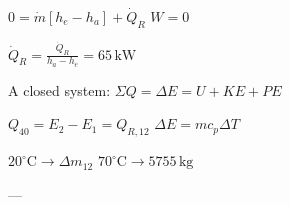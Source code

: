 \( 0 = \dot{m} \left[ h_e - h_a \right] + \dot{Q}_R \)  
\( W = 0 \)  

\( \dot{Q}_R = \frac{\dot{Q}_R}{h_a - h_e} = 65 \, \text{kW} \)  

A closed system:  
\( \Sigma Q = \Delta E = U + KE + PE \)  

\( Q_{40} = E_2 - E_1 = Q_{R,12} \)  
\( \Delta E = m c_p \Delta T \)  

\( 20^\circ \text{C} \to \Delta m_{12} \)  
\( 70^\circ \text{C} \to 5755 \, \text{kg} \)

---